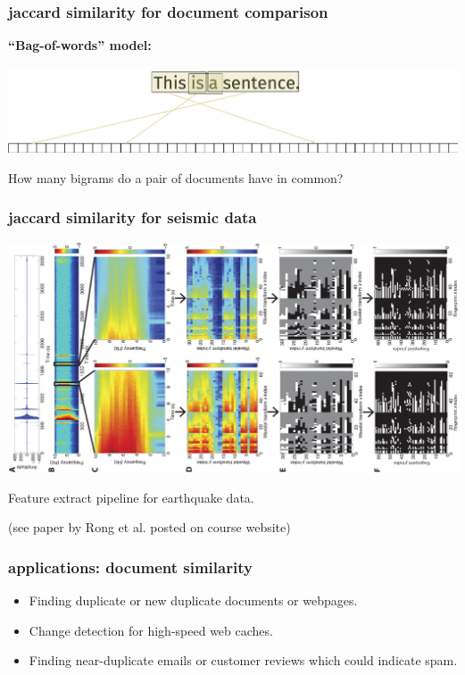 \documentclass[compress]{beamer}
\begin{document}
\begin{frame}
	\frametitle{jaccard similarity for document comparison}
	\textbf{``Bag-of-words'' model:}
	\begin{center}
			\includegraphics[width=.95\textwidth]{bigrams.png}
		\end{center}
	
	How many bigrams do a pair of documents have in common?
\end{frame}

\begin{frame}
	\frametitle{jaccard similarity for seismic data}
	\begin{center}
			\vspace{-.5em}
			\includegraphics[width=.6\textwidth]{earthquakeFeatures.jpg}
			
			\vspace{-.5em}
			Feature extract pipeline for earthquake data.
			
			(see paper by Rong et al. posted on course website)
		\end{center}
\end{frame}

\begin{frame}
	\frametitle{applications: document similarity}
	\begin{itemize}
			\item Finding duplicate or new duplicate documents or webpages.
			\item Change detection for high-speed web caches.
			\item Finding near-duplicate emails or customer reviews which could indicate spam.
		\end{itemize}
	
\end{frame}
\end{document}
